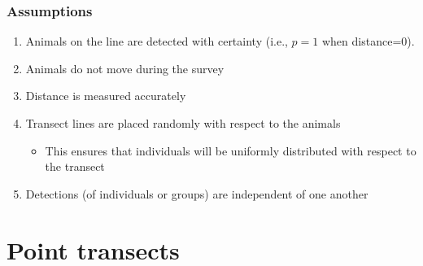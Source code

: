 \documentclass[color=usenames,dvipsnames]{beamer}\usepackage[]{graphicx}\usepackage[]{color}
\begin{document}







\begin{frame}
  \frametitle{Assumptions}
  \large
  \begin{enumerate}[<+- | visible@+->][(1)]%
    \item Animals on the line are detected with certainty (i.e., $p=1$ when distance=0).
    \item Animals do not move during the survey
    \item Distance is measured accurately
    \item Transect lines are placed randomly with respect to the animals
      \begin{itemize}
        \large
        \item This ensures that individuals will be uniformly
          distributed with respect to the transect
      \end{itemize}
    \item Detections (of individuals or groups) are independent of one another
  \end{enumerate}
\end{frame}











\section{Point transects}
\end{document}
